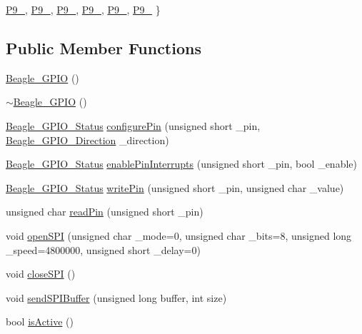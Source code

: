 \begin{DoxyCompactItemize}
\hyperlink{class_beagle___g_p_i_o_a9b1fd560ea5d2d65898ac15c23055e58a63e5191705c5489620ede54c12770707}{\-P9\-\_}, 
\hyperlink{class_beagle___g_p_i_o_a9b1fd560ea5d2d65898ac15c23055e58ab920572dcdb119cfbfe25d2469dbca5b}{\-P9\-\_}, 
\*
\hyperlink{class_beagle___g_p_i_o_a9b1fd560ea5d2d65898ac15c23055e58ae07bf8fe64010d715b5dd5be067dd9f3}{\-P9\-\_}, 
\hyperlink{class_beagle___g_p_i_o_a9b1fd560ea5d2d65898ac15c23055e58ad3f597637c11cf62e692e73f5aa16bd2}{\-P9\-\_}, 
\hyperlink{class_beagle___g_p_i_o_a9b1fd560ea5d2d65898ac15c23055e58a38691f6dcec05141eacf931558bcb7e4}{\-P9\-\_}, 
\hyperlink{class_beagle___g_p_i_o_a9b1fd560ea5d2d65898ac15c23055e58a551be651827683680e601cdfe9f753a9}{\-P9\-\_}
 \}
\end{DoxyCompactItemize}
\subsection*{\-Public \-Member \-Functions}
\begin{DoxyCompactItemize}
\item 
\hyperlink{class_beagle___g_p_i_o_a9d59bb015cf2fd0643905cdf3f265efe}{\-Beagle\-\_\-\-G\-P\-I\-O} ()
\item 
\hyperlink{class_beagle___g_p_i_o_a602473a6b993564cd7adbb9c9d09695c}{$\sim$\-Beagle\-\_\-\-G\-P\-I\-O} ()
\item 
\hyperlink{class_beagle___g_p_i_o_a40ebd672d74de41bbf5944109e1302ee}{\-Beagle\-\_\-\-G\-P\-I\-O\-\_\-\-Status} \hyperlink{class_beagle___g_p_i_o_abdcefa3029c653b16bdf11075601b1fa}{configure\-Pin} (unsigned short \-\_\-pin, \hyperlink{class_beagle___g_p_i_o_abf8efba9f6a4f6b552d1c15c99100765}{\-Beagle\-\_\-\-G\-P\-I\-O\-\_\-\-Direction} \-\_\-direction)
\item 
\hyperlink{class_beagle___g_p_i_o_a40ebd672d74de41bbf5944109e1302ee}{\-Beagle\-\_\-\-G\-P\-I\-O\-\_\-\-Status} \hyperlink{class_beagle___g_p_i_o_a7b67e50e7cc1dfa3a5be88d6c4ed8229}{enable\-Pin\-Interrupts} (unsigned short \-\_\-pin, bool \-\_\-enable)
\item 
\hyperlink{class_beagle___g_p_i_o_a40ebd672d74de41bbf5944109e1302ee}{\-Beagle\-\_\-\-G\-P\-I\-O\-\_\-\-Status} \hyperlink{class_beagle___g_p_i_o_a33d763b486233269f5e8045b69d9ec49}{write\-Pin} (unsigned short \-\_\-pin, unsigned char \-\_\-value)
\item 
unsigned char \hyperlink{class_beagle___g_p_i_o_a698b1f9ef0e609f1b28d823a7d01a8d6}{read\-Pin} (unsigned short \-\_\-pin)
\item 
void \hyperlink{class_beagle___g_p_i_o_a661c40e472c9e7795cc92718ad4b2d30}{open\-S\-P\-I} (unsigned char \-\_\-mode=0, unsigned char \-\_\-bits=8, unsigned long \-\_\-speed=4800000, unsigned short \-\_\-delay=0)
\item 
void \hyperlink{class_beagle___g_p_i_o_a747aaea28330bc339002e43f0e04bb0c}{close\-S\-P\-I} ()
\item 
void \hyperlink{class_beagle___g_p_i_o_a74e936b8da8c28a39a44707317059a01}{send\-S\-P\-I\-Buffer} (unsigned long buffer, int size)
\item 
bool \hyperlink{class_beagle___g_p_i_o_a7a5bcd9a30ae1564f59c94a5c5887b32}{is\-Active} ()
\end{DoxyCompactItemize}
